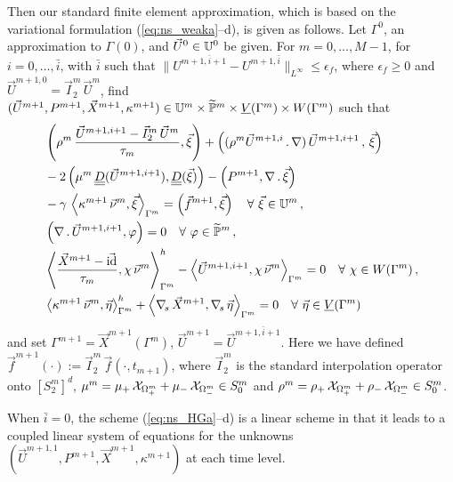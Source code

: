 Then our standard finite element approximation, which is based on the
variational formulation (\ref{eq:ns_weaka}--d), is given as follows. Let
$\Gamma^0$, an approximation to $\Gamma(0)$, and $\vec U^0\in \mathbb{U}^0$ be
given. For $m=0,\ldots, M-1$, for $i=0,\ldots, \bar{i}$, with $\bar{i}$ such
that $\|U^{m+1,\bar{i}+1}-U^{m+1,\bar{i}} \|_{L^\infty}\leq\epsilon_f$,
where $\epsilon_f \geq 0$ and $\vec U^{m+1,0}=\vec I^m_2\,\vec U^m$, find $(\vec
U^{m+1},P^{m+1}, \vec{X}^{m+1}, \kappa^{m+1}) \in \mathbb{U}^m\times \widetilde{\mathbb{P}}^m
\times \underline{V}(\Gamma^m) \times W(\Gamma^m)$ such that
\begin{subequations}
\begin{align}
& \left( \rho^{m}\,\frac{\vec U^{m+1,i+1} - \vec I^m_2\,\vec U^m}{\tau_m}, \vec
\xi \right) + \left((\rho^{m}\vec U^{m+1,i}\,.\,\nabla)\,\vec U^{m+1,i+1}\,,
\,\vec \xi \right)\nonumber \\
& - 2\left(\mu^m\,\mat D(\vec U^{m+1,i+1}), \mat D(\vec \xi) \right)
- \left(P^{m+1}, \nabla\,.\,\vec \xi\right) \nonumber \\
& - \gamma\,\left\langle \kappa^{m+1}\,\vec\nu^m,\vec\xi\right\rangle_{\Gamma^m}
= \left(\vec f^{m+1}, \vec \xi\right)  \quad \forall\ \vec\xi \in \uspace^m\,,
\label{eq:ns_HGa} \\
& \left(\nabla\,.\,\vec U^{m+1,i+1}, \varphi\right)  = 0
\quad \forall\ \varphi \in \pnormspace^m\,,\label{eq:ns_HGb} \\
&  \left\langle \frac{\vec X^{m+1} - \vec\id}{\tau_m} ,\chi\,\vec\nu^m
\right\rangle_{\Gamma^m}^h - \left\langle \vec U^{m+1,i+1}, \chi\,\vec\nu^m
\right\rangle_{\Gamma^m}  = 0 \quad \forall\ \chi \in \Wh\,, \label{eq:ns_HGc}\\
& \left\langle \kappa^{m+1}\,\vec\nu^m, \vec\eta \right\rangle_{\Gamma^m}^h
+ \left\langle \nabs\,\vec X^{m+1}, \nabs\,\vec \eta \right\rangle_{\Gamma^m} =
0 \quad \forall\ \vec\eta \in \Vh \label{eq:ns_HGd}
\end{align}
\end{subequations}
and set $\Gamma^{m+1} = \vec{X}^{m+1}(\Gamma^m)$, $\vec U^{m+1}=
\vec U^{m+1,\bar{i}+1}$. Here we have defined $\vec f^{m+1}(\cdot) := \vec
I^m_2\,\vec f(\cdot,t_{m+1})$, where $\vec I^m_2$ is the standard interpolation
operator onto $[S^m_2]^d$, $\mu^m = \mu_+\,\mathrm{\mathcal{X}}_{\Omega^m_+} +
\mu_-\,\mathrm{\mathcal{X}}_{\Omega^m_-} \in S^m_0$ and $\rho^m =
\rho_+\,\mathrm{\mathcal{X}}_{\Omega^m_+} + \rho_-\,\mathrm{\mathcal{X}}_{\Omega^m_-}\in S^m_0$.

When $\bar{i}=0$, the scheme (\ref{eq:ns_HGa}--d) is a linear scheme in that it
leads to a coupled linear system of equations for the unknowns $(\vec U^{m+1,1},
P^{m+1}, \vec{X}^{m+1}, \kappa^{m+1})$ at each time level.

